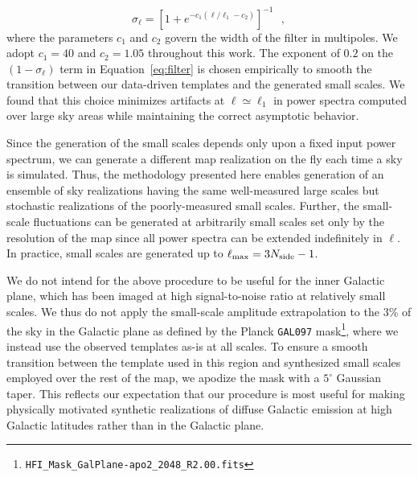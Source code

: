 \documentclass[twocolumn]{aastex631}
\begin{document}
\begin{equation}
\sigma_\ell  = \left[1+  e^{ -c_1 (\ell/ \ell_1  -c_2 )}\right]^{-1}  
~~~,
\end{equation}
where the parameters $c_1$ and $c_2$ govern the width of the filter in multipoles. We adopt $c_1=40$ and $c_2=1.05$ throughout this work. The exponent of $0.2$ on the $\left(1-\sigma_\ell\right)$ term in Equation~\ref{eq:filter} is chosen empirically to smooth the transition between our data-driven templates and the generated small scales. We found that this choice minimizes artifacts at $\ell \simeq \ell_1$ in power spectra computed over large sky areas while maintaining the correct asymptotic behavior.


Since the generation of the small scales depends only upon a fixed input power spectrum, we can generate a different map realization on the fly each time a sky is simulated. Thus, the methodology presented here enables generation of an ensemble of sky realizations having the same well-measured large scales but stochastic realizations of the poorly-measured small scales. Further, the small-scale fluctuations can be generated at arbitrarily small scales set only by the resolution of the map since all power spectra can be extended indefinitely in $\ell$. In practice, small scales are generated up to $\ell_{\rm max} = 3N_{\rm side}-1$.

We do not intend for the above procedure to be useful for the inner Galactic plane, which has been imaged at high signal-to-noise ratio at relatively small scales. We thus do not apply the small-scale amplitude extrapolation to the $3\%$ of the sky in the Galactic plane as defined by the Planck \texttt{GAL097} mask\footnote{\texttt{HFI\_Mask\_GalPlane-apo2\_2048\_R2.00.fits}}, where we instead use the observed templates as-is at all scales. To ensure a smooth transition between the template used in this region and synthesized small scales employed over the rest of the map, we apodize the mask with a $5^\circ$ Gaussian taper. This reflects our expectation that our procedure is most useful for making physically motivated synthetic realizations of diffuse Galactic emission at high Galactic latitudes rather than in the Galactic plane.
\end{document}
